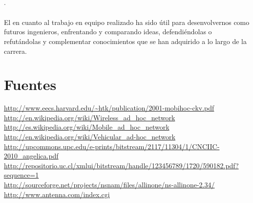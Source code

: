 \documentclass[12pt]{article}
\begin{document}
\paragraph{$\cdot$}El en cuanto al trabajo en equipo realizado ha sido útil para desenvolvernos como 
futuros ingenieros, enfrentando y comparando ideas, defendiéndolas o refutándolas y complementar 
conocimientos que se han adquirido a lo largo de la carrera.


\newpage

%
\section{Fuentes}
\url{http://www.eecs.harvard.edu/~htk/publication/2001-mobihoc-ckv.pdf}\\

\url{http://en.wikipedia.org/wiki/Wireless_ad_hoc_network}\\

\url{http://es.wikipedia.org/wiki/Mobile_ad_hoc_network}\\

\url{http://en.wikipedia.org/wiki/Vehicular_ad-hoc_network}\\

\url{http://upcommons.upc.edu/e-prints/bitstream/2117/11304/1/CNCIIC-2010_angelica.pdf}\\

\url{http://repositorio.uc.cl/xmlui/bitstream/handle/123456789/1720/590182.pdf?sequence=1}\\

\url{http://sourceforge.net/projects/nsnam/files/allinone/ns-allinone-2.34/}\\

\url{http://www.antenna.com/index.cgi}\\
\end{document}
